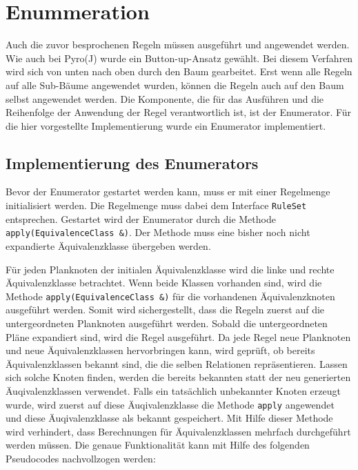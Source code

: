 \section{Enummeration}

Auch die zuvor besprochenen Regeln müssen ausgeführt und angewendet werden. Wie auch bei Pyro(J) wurde ein Button-up-Ansatz gewählt. Bei diesem Verfahren wird sich von unten nach oben durch den Baum gearbeitet. Erst wenn alle Regeln auf alle Sub-Bäume angewendet wurden, können die Regeln auch auf den Baum selbst angewendet werden. Die Komponente, die für das Ausführen und die Reihenfolge der Anwendung der Regel verantwortlich ist, ist der Enumerator. Für die hier vorgestellte Implementierung wurde ein Enumerator implementiert.


\subsection{Implementierung des Enumerators}

Bevor der Enumerator gestartet werden kann, muss er mit einer Regelmenge initialisiert werden. Die Regelmenge muss dabei dem Interface \texttt{RuleSet} entsprechen. Gestartet wird der Enumerator durch die Methode \texttt{apply(EquivalenceClass \&)}. Der Methode muss eine bisher noch nicht expandierte Äquivalenzklasse übergeben werden. 

Für jeden Planknoten der initialen Äquivalenzklasse wird die linke und rechte Äquivalenzklasse betrachtet. Wenn beide Klassen vorhanden sind, wird die Methode \texttt{apply(EquivalenceClass \&)} für die vorhandenen Äquivalenzknoten ausgeführt werden. Somit wird sichergestellt, dass die Regeln zuerst auf die untergeordneten Planknoten ausgeführt werden. Sobald die untergeordneten Pläne expandiert sind, wird die Regel ausgeführt. Da jede Regel neue Planknoten und neue Äquivalenzklassen hervorbringen kann, wird geprüft, ob bereits Äquivalenzklassen bekannt sind, die die selben Relationen repräsentieren. Lassen sich solche Knoten finden, werden die bereits bekannten statt der neu generierten Äuqivalenzklassen verwendet. Falls ein tatsächlich unbekannter Knoten erzeugt wurde, wird zuerst auf diese Äuqivalenzklasse die Methode \texttt{apply} angewendet und diese Äuqivalenzklasse als bekannt gespeichert. Mit Hilfe dieser Methode wird verhindert, dass Berechnungen für Äquivalenzklassen mehrfach durchgeführt werden müssen. Die genaue Funktionalität kann mit Hilfe des folgenden Pseudocodes nachvollzogen werden:



